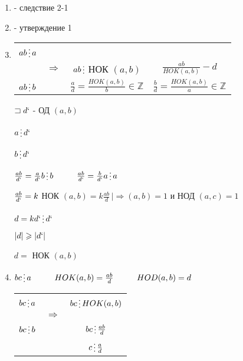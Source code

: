 \documentclass[12pt]{article}
\begin{document}
    \begin{enumerate}
        \item - следствие 2-1
        \item - утверждение 1
        \item
        \begin{tabular}{c|ccc}
            $ab \mathop{\raisebox{-2pt}{\vdots}} a$ \\
            & $\Rightarrow$ & $ab \mathop{\raisebox{-2pt}{\vdots}}$ НОК $(a,b)$ & $\frac{ab}{HOK(a,b)} -d$ \\
            $ab \mathop{\raisebox{-2pt}{\vdots}} b$ & & $\frac{a}{d} = \frac{HOK(a,b)}{b} \in \mathbb{Z}$ & $\frac{b}{d} = \frac{HOK(a,b)}{a} \in \mathbb{Z}$ \\
        \end{tabular}\par
        $\sqsupset d`$ - ОД $(a,b)$\par
        $a \mathop{\raisebox{-2pt}{\vdots}} d`$\par
        $b \mathop{\raisebox{-2pt}{\vdots}} d`$\par
        $\frac{ab}{d`} = \frac{a}{d`}b \mathop{\raisebox{-2pt}{\vdots}} b \hspace{1 cm} \frac{ab}{d`} = \frac{b}{d`}a \mathop{\raisebox{-2pt}{\vdots}} a$\par
        $\frac{ab}{d`}=k$ НОК $(a,b) = k \frac{ab}{d} \, | \Rightarrow (a,b) = 1$ и НОД $(a,c)=1$\par
        $d = kd` \mathop{\raisebox{-2pt}{\vdots}} d`$\par
        $|d| \geqslant |d`|$\par
        $d =$ НОК $(a,b)$\par
        \item $bc \mathop{\raisebox{-2pt}{\vdots}} a \hspace{1 cm} HOK(a,b) = \frac{ab}{d} \hspace{1 cm} HOD(a,b) = d$\par
        \begin{tabular}{c|cc}
           $bc \mathop{\raisebox{-2pt}{\vdots}} a$  & & $bc \mathop{\raisebox{-2pt}{\vdots}} HOK(a,b)$ \\
           & $\Rightarrow$ \\
           $bc \mathop{\raisebox{-2pt}{\vdots}} b$  & & $bc \mathop{\raisebox{-2pt}{\vdots}} \frac{ab}{d}$ \\
           & & $c \mathop{\raisebox{-2pt}{\vdots}} \frac{a}{d}$ \\
        \end{tabular}\par
        

\end{enumerate}
\end{document}
